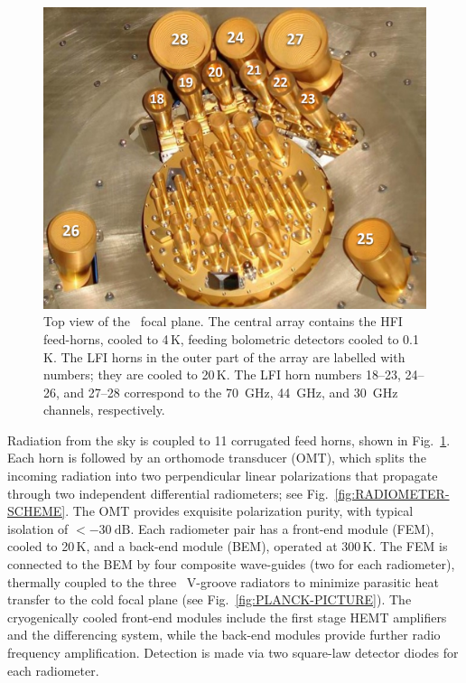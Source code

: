 \documentclass[twocolumn]{aa}
\begin{document}
\begin{figure}[t]
	\center
	\includegraphics[width=\linewidth]{figs/FOCAL-PLANE.png}
	\caption{Top view of the \Planck\ focal plane. The central array contains
    the HFI feed-horns, cooled to 4\,K, feeding bolometric detectors cooled to
    0.1\,K. The LFI horns in the outer part of the array are labelled with
    numbers; they are cooled to 20\,K. The LFI horn numbers 18--23, 24--26, and
    27--28 correspond to the 70~GHz, 44~GHz, and 30~GHz channels, respectively. }
	\label{fig:FOCAL-PLANE}
\end{figure}

Radiation from the sky is coupled to 11 corrugated feed horns, shown in
Fig.~\ref{fig:FOCAL-PLANE}. Each horn is followed by an orthomode
transducer (OMT), which splits the incoming radiation into two
perpendicular linear polarizations that propagate through two
independent differential radiometers; see
Fig.~\ref{fig:RADIOMETER-SCHEME}. The OMT provides exquisite
polarization purity, with typical isolation of ${<-30~\mathrm{dB}}$. Each
radiometer pair has a front-end module (FEM), cooled to 20\,K, and a
back-end module (BEM), operated at 300\,K. The FEM is connected to the
BEM by four composite wave-guides (two for each radiometer), thermally
coupled to the three \Planck\ V-groove radiators to minimize parasitic
heat transfer to the cold focal plane (see
Fig.~\ref{fig:PLANCK-PICTURE}). The cryogenically cooled front-end
modules include the first stage HEMT amplifiers and the differencing
system, while the back-end modules provide further radio frequency
amplification. Detection is made via two square-law detector diodes for
each radiometer.
\end{document}
